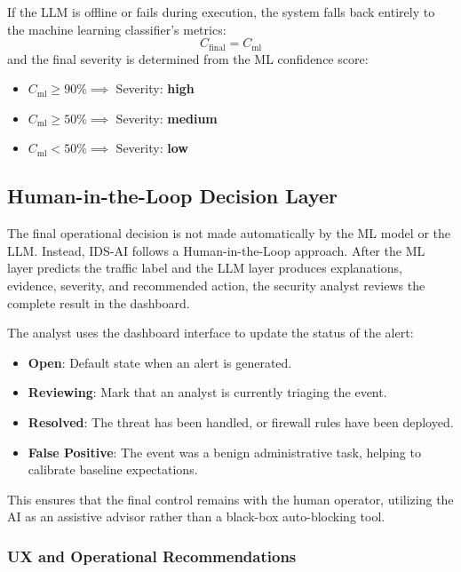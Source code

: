 \documentclass[12pt,a4paper]{report}
\begin{document}
If the LLM is offline or fails during execution, the system falls back entirely to the machine learning classifier's metrics:
\begin{equation}
  C_{\text{final}} = C_{\text{ml}}
\end{equation}
and the final severity is determined from the ML confidence score:
\begin{itemize}[leftmargin=1.5em]
  \item $C_{\text{ml}} \ge 90\% \implies$ Severity: \textbf{high}
  \item $C_{\text{ml}} \ge 50\% \implies$ Severity: \textbf{medium}
  \item $C_{\text{ml}} < 50\% \implies$ Severity: \textbf{low}
\end{itemize}

\subsection{Human-in-the-Loop Decision Layer}

The final operational decision is not made automatically by the ML model or the LLM. Instead, IDS-AI follows a Human-in-the-Loop approach. After the ML layer predicts the traffic label and the LLM layer produces explanations, evidence, severity, and recommended action, the security analyst reviews the complete result in the dashboard.

The analyst uses the dashboard interface to update the status of the alert:
\begin{itemize}[leftmargin=1.5em]
  \item \textbf{Open}: Default state when an alert is generated.
  \item \textbf{Reviewing}: Mark that an analyst is currently triaging the event.
  \item \textbf{Resolved}: The threat has been handled, or firewall rules have been deployed.
  \item \textbf{False Positive}: The event was a benign administrative task, helping to calibrate baseline expectations.
\end{itemize}
This ensures that the final control remains with the human operator, utilizing the AI as an assistive advisor rather than a black-box auto-blocking tool.

\subsubsection{UX and Operational Recommendations}
\end{document}
